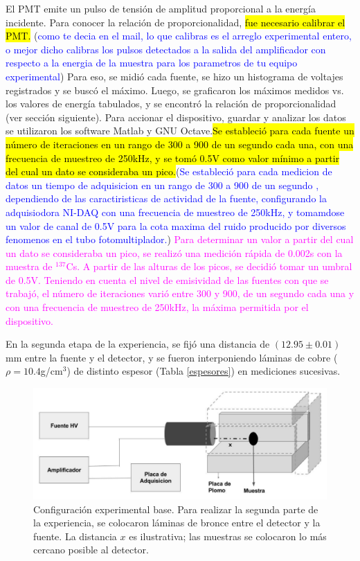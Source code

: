 \documentclass[twoside]{article}
\begin{document}
\begin{multicols}{2}
El PMT emite un pulso de tensión de amplitud proporcional a la energía incidente. Para conocer la relación de proporcionalidad, \hl{fue necesario calibrar el PMT.} (\textcolor{Blue}{como te decia en el mail, lo que calibras es el arreglo experimental entero, o mejor dicho calibras los pulsos detectados a la salida del amplificador con respecto a la energia de la muestra para los parametros de tu equipo experimental}) Para eso, se midió cada fuente, se hizo un histograma de voltajes registrados y se buscó el máximo. Luego, se graficaron los máximos medidos vs. los valores de energía tabulados, y se encontró la relación de proporcionalidad (ver sección siguiente). Para accionar el dispositivo, guardar y analizar los datos se utilizaron los software Matlab y GNU Octave.\hl{Se estableció para cada fuente un número de iteraciones en un rango de 300 a 900 de un segundo cada una, con una frecuencia de muestreo de 250kHz, y se tomó 0.5V como valor mínimo a partir del cual un dato se consideraba un pico.}(\textcolor{Blue}{Se estableció para cada medicion de datos un tiempo de adquisicion en un rango de 300 a 900 de un segundo , dependiendo de las caractiristicas de actividad de la fuente, configurando la adquisiodora NI-DAQ con una frecuencia de muestreo de 250kHz, y tomamdose un valor de canal de 0.5V para la cota maxima del ruido producido por diversos fenomenos en el tubo fotomultiplador.}) \textcolor{magenta}{Para determinar un valor a partir del cual un dato se consideraba un pico, se realizó una medición rápida de 0.002s con la muestra de $^{137}$Cs. A partir de las alturas de los picos, se decidió tomar un umbral de 0.5V. Teniendo en cuenta el nivel de emisividad de las fuentes con que se trabajó, el número de iteraciones varió entre 300 y 900, de un segundo cada una y con una frecuencia de muestreo de 250kHz, la máxima permitida por el dispositivo.}

En la segunda etapa de la experiencia, se fijó una distancia de $(12.95 \pm 0.01)$mm entre la fuente y el detector, y se fueron interponiendo láminas de cobre ($\rho = 10.4$g/cm$^3$) de distinto espesor (Tabla \ref{espesores}) en mediciones sucesivas.


\begin{figure}[H]
    \centering
    \includegraphics[scale=0.15]{ExpeNu.png}
    \caption{Configuración experimental base. Para realizar la segunda parte de la experiencia, se colocaron láminas de bronce entre el detector y la fuente. La distancia $x$ es ilustrativa; las muestras se colocaron lo más cercano posible al detector.}
    \label{experimental}
\end{figure}


\end{multicols}
\end{document}
